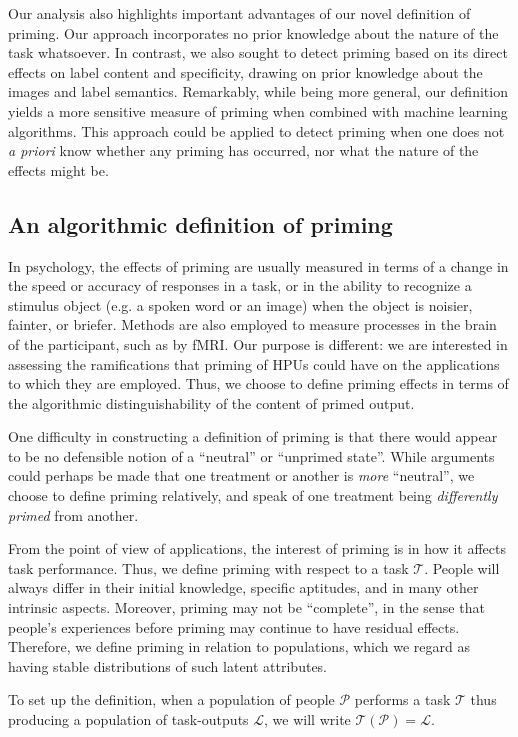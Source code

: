 \documentclass[letterpaper]{article}
\begin{document}
Our analysis also highlights important advantages of our novel definition of 
priming.  Our approach incorporates no prior knowledge about the nature
of the task whatsoever.  In contrast, we also sought to detect priming
based on its direct effects on label content and specificity,
drawing on prior knowledge about the images and label semantics.
Remarkably, while being more general, our definition yields a more sensitive
measure of priming when combined with machine learning algorithms. 
This approach could be applied to detect priming when one does not 
\emph{a priori} know whether any priming has occurred, 
nor what the nature of the effects might be.
\subsection*{An algorithmic definition of priming}
In psychology, the effects of priming are usually measured in terms of a 
change in the  
speed or accuracy of responses in a task, or in the ability to recognize a 
stimulus object (e.g. a spoken word or an image) when the object is noisier, 
fainter, or briefer.  Methods are also employed to measure processes
in the brain of the participant, such as by fMRI.  Our purpose is different: 
we are interested in assessing the ramifications that priming of HPUs could 
have on the applications to which they are employed.
Thus, we choose to define priming effects in terms of the algorithmic 
distinguishability of the content of primed output.

One difficulty in constructing a definition of priming is that there would 
appear to be no defensible notion of a ``neutral'' or ``unprimed state''.  
While arguments could perhaps be made that one treatment or another is 
\textit{more} 
``neutral'', we choose to define priming relatively, and speak of one 
treatment being \textit{differently primed} from another.

From the point of view of applications, the interest of priming is in how it
affects task performance. Thus, we define priming with respect to a task $\mathcal{T}$.  People will always differ in their initial knowledge, specific 
aptitudes, and in many other intrinsic aspects.  Moreover, priming may not be 
``complete'', in the sense that people's experiences before
priming may continue to have residual effects.  Therefore, we define priming 
in relation to populations, which we regard as having stable distributions of
such latent attributes.

To set up the definition, when a population of people $\mathcal{P}$ performs
a task $\mathcal{T}$ thus producing a population of task-outputs $\mathcal{L}$,
we will write $\mathcal{T}(\mathcal{P}) = \mathcal{L}$.
\end{document}
